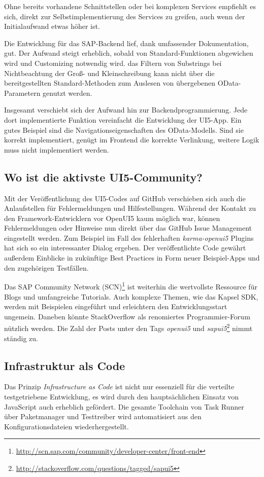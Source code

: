 Ohne bereits vorhandene Schnittstellen oder bei komplexen Services empfiehlt es sich, direkt zur Selbstimplementierung des Services zu greifen, auch wenn der Initialaufwand etwas höher ist. 

Die Entwicklung für das SAP-Backend lief, dank umfassender Dokumentation, gut. Der Aufwand steigt erheblich, sobald von Standard-Funktionen abgewichen wird und Customizing notwendig wird. \ZB das Filtern von Substrings bei Nichtbeachtung der Groß- und Kleinschreibung kann nicht über die bereitgestellten Standard-Methoden zum Auslesen von übergebenen OData-Parametern genutzt werden. 

Insgesamt verschiebt sich der Aufwand hin zur Backendprogrammierung. Jede dort implementierte Funktion vereinfacht die Entwicklung der UI5-App. Ein gutes Beispiel sind die Navigationseigenschaften des OData-Modells. Sind sie korrekt implementiert, genügt im Frontend die korrekte Verlinkung, weitere Logik muss nicht implementiert werden.


\subsection{Wo ist die aktivste UI5-Community?}
Mit der Veröffentlichung des UI5-Codes auf GitHub verschieben sich auch die Anlaufstellen für Fehlermeldungen und Hilfestellungen. Während der Kontakt zu den Framework-Entwicklern vor OpenUI5 kaum möglich war, können Fehlermeldungen oder Hinweise nun direkt über das GitHub Issue Management eingestellt werden. Zum Beispiel im Fall des fehlerhaften \textit{karma-openui5} Plugins hat sich so ein interessanter Dialog ergeben. Der veröffentlichte Code gewährt außerdem Einblicke in zukünftige Best Practices in Form neuer Beispiel-Apps und den zugehörigen Testfällen.

Das SAP Community Network (SCN)\footnote{\url{http://scn.sap.com/community/developer-center/front-end}} ist weiterhin die wertvollste Ressource für Blogs und umfangreiche Tutorials. Auch komplexe Themen, wie das Kapsel SDK, werden mit Beispielen eingeführt und erleichtern den Entwicklungsstart ungemein. Daneben könnte StackOverflow als renomiertes Programmier-Forum nützlich werden. Die Zahl der Posts unter den Tags \textit{openui5} und \textit{sapui5}\footnote{\url{http://stackoverflow.com/questions/tagged/sapui5}} nimmt ständig zu.

\subsection{Infrastruktur als Code}
Das Prinzip \textit{Infrastructure as Code} ist nicht nur essenziell für die verteilte testgetriebene Entwicklung, es wird durch den hauptsächlichen Einsatz von JavaScript auch erheblich gefördert. Die gesamte Toolchain von Task Runner über Paketmanager und Testtreiber wird automatisiert aus den Konfigurationsdateien wiederhergestellt. 

